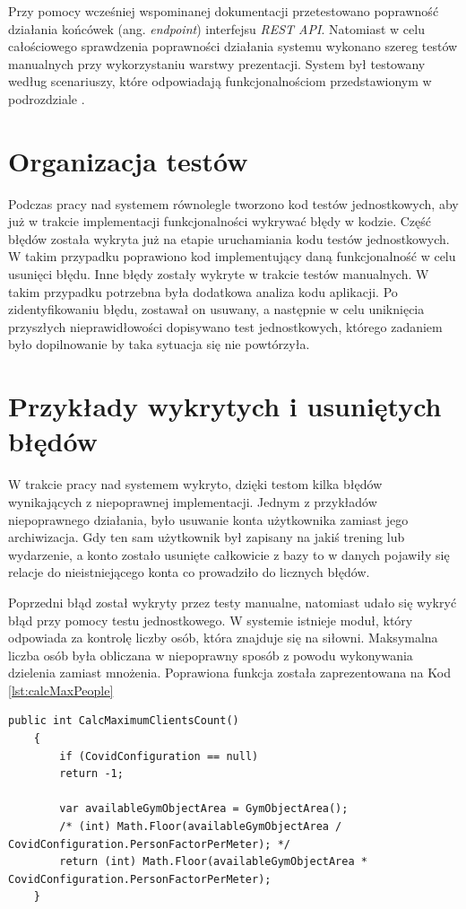 \documentclass[a4paper,twoside,12pt]{book}
\newcommand{\obcy}[1]{\emph{#1}}
\newcommand{\ang}[1]{{\selectlanguage{british}\obcy{#1}}}
\begin{document}
Przy pomocy wcześniej wspominanej dokumentacji przetestowano poprawność działania końcówek (ang. \ang{endpoint}) interfejsu \textit{REST API}. Natomiast w celu całościowego sprawdzenia poprawności działania systemu wykonano szereg testów manualnych przy wykorzystaniu warstwy prezentacji. System był testowany według scenariuszy, które odpowiadają funkcjonalnościom przedstawionym w podrozdziale \textbf{}.

\section{Organizacja testów}
Podczas pracy nad systemem równolegle tworzono kod testów jednostkowych, aby już w trakcie implementacji funkcjonalności wykrywać błędy w kodzie. Część błędów została wykryta już na etapie uruchamiania kodu testów jednostkowych. W takim przypadku poprawiono kod implementujący daną funkcjonalność w celu usunięci błędu. Inne błędy zostały wykryte w trakcie testów manualnych. W takim przypadku potrzebna była dodatkowa analiza kodu aplikacji. Po zidentyfikowaniu błędu, zostawał on usuwany, a następnie w celu uniknięcia przyszłych nieprawidłowości dopisywano test jednostkowych, którego zadaniem było dopilnowanie by taka sytuacja się nie powtórzyła.

\section{Przykłady wykrytych i usuniętych błędów}
W trakcie pracy nad systemem wykryto, dzięki testom kilka błędów wynikających z niepoprawnej implementacji. Jednym z przykładów niepoprawnego działania, było usuwanie konta użytkownika zamiast jego archiwizacja. Gdy ten sam użytkownik był zapisany na jakiś trening lub wydarzenie, a konto zostało usunięte całkowicie z bazy to w danych pojawiły się relacje do nieistniejącego konta co prowadziło do licznych błędów.

Poprzedni błąd został wykryty przez testy manualne, natomiast udało się wykryć błąd przy pomocy testu jednostkowego. W systemie istnieje moduł, który odpowiada za kontrolę liczby osób, która znajduje się na siłowni. Maksymalna liczba osób była obliczana w niepoprawny sposób z powodu wykonywania dzielenia zamiast mnożenia. Poprawiona funkcja została zaprezentowana na Kod \ref{lst:calcMaxPeople}
\begin{lstlisting}[caption={Metoda licząca jaka jest maksymalna liczba osób, która znajduje się w jednej chwili w obiekcie siłowni}, label={lst:calcMaxPeople}]
	public int CalcMaximumClientsCount()
	{
		if (CovidConfiguration == null)
		return -1;
		
		var availableGymObjectArea = GymObjectArea();
		/* (int) Math.Floor(availableGymObjectArea / CovidConfiguration.PersonFactorPerMeter); */
		return (int) Math.Floor(availableGymObjectArea * CovidConfiguration.PersonFactorPerMeter);
	}
\end{lstlisting}
\end{document}
